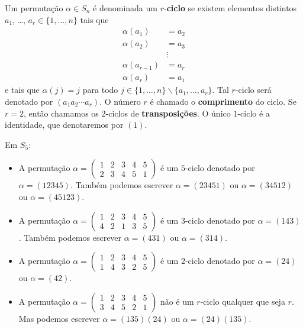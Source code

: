 \begin{definicao}
	Um permuta\c{c}\~ao $\alpha \in S_n$ \'e denominada um $r$-\textbf{ciclo} se existem elementos distintos $a_1$, \dots, $a_r \in \{1, \dots, n\}$ tais que
	\begin{align*}
		\alpha(a_1) &= a_2\\
		\alpha(a_2) &= a_3\\
		&\vdots\\
		\alpha(a_{r - 1}) &= a_r\\
		\alpha(a_r) &= a_1
	\end{align*}
	e tais que $\alpha(j) = j$ para todo $j \in \{1, \dots, n\}\backslash \{a_1, \dots, a_r\}$. Tal $r$-ciclo ser\'a denotado por $(a_1 a_2 \cdots a_r)$. O n\'umero $r$ \'e chamado o \textbf{comprimento} do ciclo. Se $r = 2$, ent\~ao chamamos os $2$-ciclos de \textbf{transposi\c{c}\~oes}. O \'unico $1$-ciclo \'e a identidade, que denotaremos por $(1)$.
\end{definicao}

\begin{exemplos}
	Em $S_5$:
	\begin{itemize}
		\item A permuta\c{c}\~ao $\alpha = \begin{pmatrix}
			1 & 2 & 3 & 4 & 5\\
			2 & 3 & 4 & 5 & 1
		\end{pmatrix}$ \'e um $5$-ciclo denotado por $\alpha = (12345)$. Tamb\'em podemos escrever $\alpha = (23451)$ ou $\alpha = (34512)$ ou $\alpha = (45123)$.

		\item A permuta\c{c}\~ao $\alpha = \begin{pmatrix}
			1 & 2 & 3 & 4 & 5\\
			4 & 2 & 1 & 3 & 5
		\end{pmatrix}$ \'e um $3$-ciclo denotado por $\alpha = (143)$. Tamb\'em podemos escrever $\alpha = (431)$ ou $\alpha = (314)$.

		\item A permuta\c{c}\~ao $\alpha = \begin{pmatrix}
			1 & 2 & 3 & 4 & 5\\
			1 & 4 & 3 & 2 & 5
		\end{pmatrix}$ \'e um $2$-ciclo denotado por $\alpha = (24)$ ou $\alpha = (42)$.

		\item A permuta\c{c}\~ao $\alpha = \begin{pmatrix}
			1 & 2 & 3 & 4 & 5\\
			3 & 4 & 5 & 2 & 1
		\end{pmatrix}$ n\~ao \'e um $r$-ciclo qualquer que seja $r$. Mas podemos escrever $\alpha = (135)(24)$ ou $\alpha = (24)(135)$.
	\end{itemize}
\end{exemplos}

